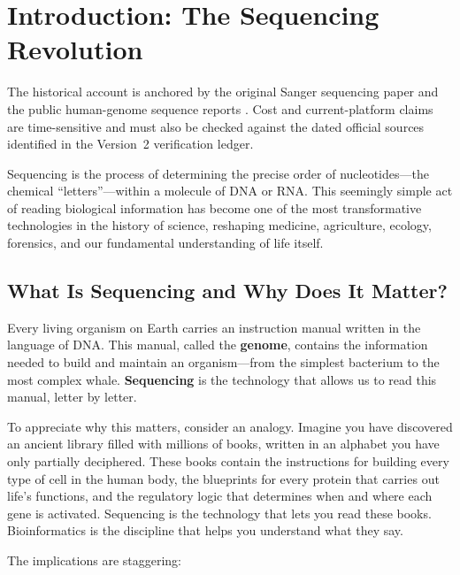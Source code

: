 \chapter{Introduction: The Sequencing Revolution}
\label{ch:introduction}

\begin{sourcebox}
The historical account is anchored by the original Sanger sequencing paper and the public human-genome sequence reports \cite{sanger1977,venter2001}. Cost and current-platform claims are time-sensitive and must also be checked against the dated official sources identified in the Version~2 verification ledger.
\end{sourcebox}

\begin{keyconcept}
Sequencing is the process of determining the precise order of nucleotides---the chemical ``letters''---within a molecule of DNA or RNA. This seemingly simple act of reading biological information has become one of the most transformative technologies in the history of science, reshaping medicine, agriculture, ecology, forensics, and our fundamental understanding of life itself.
\end{keyconcept}

\section{What Is Sequencing and Why Does It Matter?}
\label{sec:intro:what-is-sequencing}

Every living organism on Earth carries an instruction manual written in the language of DNA. This manual, called the \textbf{genome}, contains the information needed to build and maintain an organism---from the simplest bacterium to the most complex whale. \textbf{Sequencing} is the technology that allows us to read this manual, letter by letter.

To appreciate why this matters, consider an analogy. Imagine you have discovered an ancient library filled with millions of books, written in an alphabet you have only partially deciphered. These books contain the instructions for building every type of cell in the human body, the blueprints for every protein that carries out life's functions, and the regulatory logic that determines when and where each gene is activated. Sequencing is the technology that lets you read these books. Bioinformatics is the discipline that helps you understand what they say.

The implications are staggering:

